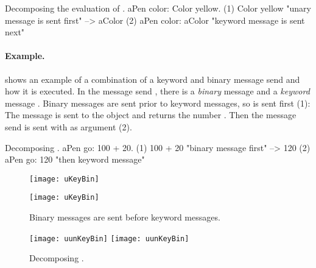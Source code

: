 \documentclass[a4paper,10pt,twoside]{book}
\begin{document}
\begin{example}[decColor]{Decomposing the evaluation of .}{}
        aPen color: Color yellow.
(1)                       Color yellow        "unary message is sent first"
                        --> aColor
(2)   aPen color: aColor                 "keyword message is sent next"
\end{example}

\paragraph{Example.}
 shows an example of a combination of a keyword and binary message send and how it is executed.
In the message send , there is a \emph{binary} message  and a \emph{keyword} message .
Binary messages are sent prior to keyword messages, so  is sent first (1):
The message  is sent to the object  and returns the number .
Then the message send  is sent with  as argument (2).

\begin{example}[decGo]{Decomposing .}{}
      aPen go: 100 + 20.   
(1)                 100 + 20           "binary message first"
                   -->   120
(2)  aPen go: 120                   "then keyword message"
\end{example}

\begin{figure}[htb]
\begin{minipage}[t]{0.48\textwidth}
	\ifluluelse
		{\centerline{\texttt{[image: uKeyBin]}}}
		{\centerline{\texttt{[image: uKeyBin]}}}
	\caption{Binary messages are sent before keyword messages.\label{fig:uKeyBin}}
\end{minipage}
\hfill
\begin{minipage}[t]{0.48\textwidth}
	\begin{center}
	\ifluluelse
		{\texttt{[image: uunKeyBin]}}
		{\texttt{[image: uunKeyBin]}}
\caption{Decomposing .}\label{fig:unKeyBin}
\end{center}
\end{minipage}
\end{figure}

\end{document}
